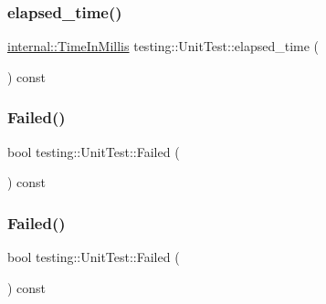 \mbox{\label{classtesting_1_1_unit_test_acf608411a17cb3b40a1e9d724f262b3b}} 
\subsubsection{\texorpdfstring{elapsed\_time()}{elapsed\_time()}\hspace{0.1cm}{\footnotesize\ttfamily [3/3]}}
{\footnotesize\ttfamily \mbox{\hyperlink{namespacetesting_1_1internal_a5eed833eddf9ea8ca45546c125f4ef0c}{internal\+::\+Time\+In\+Millis}} testing\+::\+Unit\+Test\+::elapsed\+\_\+time (\begin{DoxyParamCaption}{ }\end{DoxyParamCaption}) const}

\mbox{\label{classtesting_1_1_unit_test_a706f29e765916616b11a271a65948727}} 
\subsubsection{\texorpdfstring{Failed()}{Failed()}\hspace{0.1cm}{\footnotesize\ttfamily [1/3]}}
{\footnotesize\ttfamily bool testing\+::\+Unit\+Test\+::\+Failed (\begin{DoxyParamCaption}{ }\end{DoxyParamCaption}) const}

\mbox{\label{classtesting_1_1_unit_test_a706f29e765916616b11a271a65948727}} 
\subsubsection{\texorpdfstring{Failed()}{Failed()}\hspace{0.1cm}{\footnotesize\ttfamily [2/3]}}
{\footnotesize\ttfamily bool testing\+::\+Unit\+Test\+::\+Failed (\begin{DoxyParamCaption}{ }\end{DoxyParamCaption}) const}

